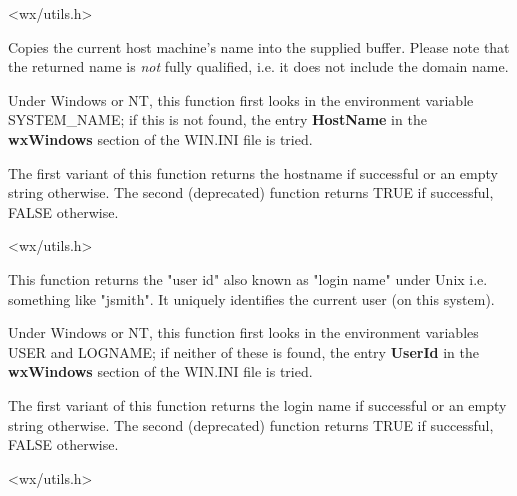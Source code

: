 
<wx/utils.h>

\label{wxgethostname}



Copies the current host machine's name into the supplied buffer. Please note
that the returned name is {\it not} fully qualified, i.e. it does not include
the domain name.

Under Windows or NT, this function first looks in the environment
variable SYSTEM\_NAME; if this is not found, the entry {\bf HostName}\rtfsp
in the {\bf wxWindows} section of the WIN.INI file is tried.

The first variant of this function returns the hostname if successful or an
empty string otherwise. The second (deprecated) function returns TRUE
if successful, FALSE otherwise.




<wx/utils.h>

\label{wxgetuserid}



This function returns the "user id" also known as "login name" under Unix i.e.
something like "jsmith". It uniquely identifies the current user (on this system).

Under Windows or NT, this function first looks in the environment
variables USER and LOGNAME; if neither of these is found, the entry {\bf UserId}\rtfsp
in the {\bf wxWindows} section of the WIN.INI file is tried.

The first variant of this function returns the login name if successful or an
empty string otherwise. The second (deprecated) function returns TRUE
if successful, FALSE otherwise.




<wx/utils.h>

\label{wxgetosdescription}

